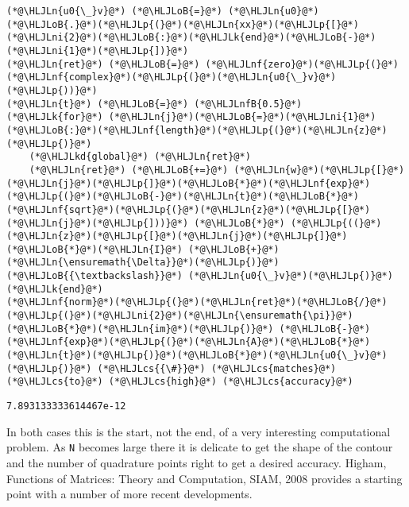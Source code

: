 \documentclass[12pt,a4paper]{article}
\newcommand{\HLJLk}[1]{\textcolor[RGB]{148,91,176}{\textbf{#1}}}
\newcommand{\HLJLkd}[1]{\textcolor[RGB]{214,102,97}{\textit{#1}}}
\newcommand{\HLJLn}[1]{#1}
\newcommand{\HLJLnf}[1]{\textcolor[RGB]{66,102,213}{#1}}
\newcommand{\HLJLnfB}[1]{\textcolor[RGB]{59,151,46}{#1}}
\newcommand{\HLJLni}[1]{\textcolor[RGB]{59,151,46}{#1}}
\newcommand{\HLJLoB}[1]{\textcolor[RGB]{102,102,102}{\textbf{#1}}}
\newcommand{\HLJLp}[1]{#1}
\newcommand{\HLJLcs}[1]{\textcolor[RGB]{153,153,119}{\textit{#1}}}
\begin{document}
\begin{lstlisting}
(*@\HLJLn{u0{\_}v}@*) (*@\HLJLoB{=}@*) (*@\HLJLn{u0}@*)(*@\HLJLoB{.}@*)(*@\HLJLp{(}@*)(*@\HLJLn{xx}@*)(*@\HLJLp{[}@*)(*@\HLJLni{2}@*)(*@\HLJLoB{:}@*)(*@\HLJLk{end}@*)(*@\HLJLoB{-}@*)(*@\HLJLni{1}@*)(*@\HLJLp{])}@*)
(*@\HLJLn{ret}@*) (*@\HLJLoB{=}@*) (*@\HLJLnf{zero}@*)(*@\HLJLp{(}@*)(*@\HLJLnf{complex}@*)(*@\HLJLp{(}@*)(*@\HLJLn{u0{\_}v}@*)(*@\HLJLp{))}@*)
(*@\HLJLn{t}@*) (*@\HLJLoB{=}@*) (*@\HLJLnfB{0.5}@*)
(*@\HLJLk{for}@*) (*@\HLJLn{j}@*)(*@\HLJLoB{=}@*)(*@\HLJLni{1}@*)(*@\HLJLoB{:}@*)(*@\HLJLnf{length}@*)(*@\HLJLp{(}@*)(*@\HLJLn{z}@*)(*@\HLJLp{)}@*)
    (*@\HLJLkd{global}@*) (*@\HLJLn{ret}@*)
    (*@\HLJLn{ret}@*) (*@\HLJLoB{+=}@*) (*@\HLJLn{w}@*)(*@\HLJLp{[}@*)(*@\HLJLn{j}@*)(*@\HLJLp{]}@*)(*@\HLJLoB{*}@*)(*@\HLJLnf{exp}@*)(*@\HLJLp{(}@*)(*@\HLJLoB{-}@*)(*@\HLJLn{t}@*)(*@\HLJLoB{*}@*)(*@\HLJLnf{sqrt}@*)(*@\HLJLp{(}@*)(*@\HLJLn{z}@*)(*@\HLJLp{[}@*)(*@\HLJLn{j}@*)(*@\HLJLp{]))}@*) (*@\HLJLoB{*}@*) (*@\HLJLp{((}@*)(*@\HLJLn{z}@*)(*@\HLJLp{[}@*)(*@\HLJLn{j}@*)(*@\HLJLp{]}@*)(*@\HLJLoB{*}@*)(*@\HLJLn{I}@*) (*@\HLJLoB{+}@*) (*@\HLJLn{\ensuremath{\Delta}}@*)(*@\HLJLp{)}@*) (*@\HLJLoB{{\textbackslash}}@*) (*@\HLJLn{u0{\_}v}@*)(*@\HLJLp{)}@*)
(*@\HLJLk{end}@*)
(*@\HLJLnf{norm}@*)(*@\HLJLp{(}@*)(*@\HLJLn{ret}@*)(*@\HLJLoB{/}@*)(*@\HLJLp{(}@*)(*@\HLJLni{2}@*)(*@\HLJLn{\ensuremath{\pi}}@*)(*@\HLJLoB{*}@*)(*@\HLJLn{im}@*)(*@\HLJLp{)}@*) (*@\HLJLoB{-}@*) (*@\HLJLnf{exp}@*)(*@\HLJLp{(}@*)(*@\HLJLn{A}@*)(*@\HLJLoB{*}@*)(*@\HLJLn{t}@*)(*@\HLJLp{)}@*)(*@\HLJLoB{*}@*)(*@\HLJLn{u0{\_}v}@*)(*@\HLJLp{)}@*) (*@\HLJLcs{{\#}}@*) (*@\HLJLcs{matches}@*) (*@\HLJLcs{to}@*) (*@\HLJLcs{high}@*) (*@\HLJLcs{accuracy}@*)
\end{lstlisting}

\begin{lstlisting}
7.893133333614467e-12
\end{lstlisting}


In both cases this is the start, not the end, of a very interesting computational problem. As \texttt{N} becomes large there it is delicate to get the shape of the contour and the number of quadrature points right to get a desired accuracy. Higham, Functions of Matrices: Theory and Computation, SIAM, 2008 provides a starting point with a number of more recent developments.
\end{document}
